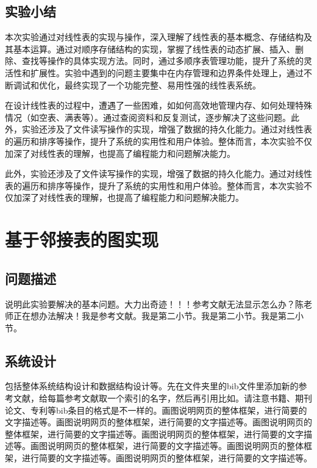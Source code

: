 \documentclass[supercite]{Experimental_Report}
\theoremstyle{definition}
\begin{document}
\subsection{实验小结}

本次实验通过对线性表的实现与操作，深入理解了线性表的基本概念、存储结构及其基本运算。通过对顺序存储结构的实现，掌握了线性表的动态扩展、插入、删除、查找等操作的具体实现方法。同时，通过多顺序表管理功能，提升了系统的灵活性和扩展性。实验中遇到的问题主要集中在内存管理和边界条件处理上，通过不断调试和优化，最终实现了一个功能完整、易用性强的线性表系统。

在设计线性表的过程中，遭遇了一些困难，如如何高效地管理内存、如何处理特殊情况（如空表、满表等）。通过查阅资料和反复测试，逐步解决了这些问题。此外，实验还涉及了文件读写操作的实现，增强了数据的持久化能力。通过对线性表的遍历和排序等操作，提升了系统的实用性和用户体验。整体而言，本次实验不仅加深了对线性表的理解，也提高了编程能力和问题解决能力。

此外，实验还涉及了文件读写操作的实现，增强了数据的持久化能力。通过对线性表的遍历和排序等操作，提升了系统的实用性和用户体验。整体而言，本次实验不仅加深了对线性表的理解，也提高了编程能力和问题解决能力。



\newpage

\section{基于邻接表的图实现}

\subsection{问题描述}

说明此实验要解决的基本问题。大力出奇迹！！！参考文献无法显示怎么办？陈老师正在想办法解决！我是参考文献。我是第二小节\cite{Mehrabian1974An}。我是第二小节\cite{Rezaei2014CVPR}。我是第二小节\cite{Ramnath2008IJCV}。

\subsection{系统设计}

包括整体系统结构设计和数据结构设计等。先在文件夹里的bib文件里添加新的参考文献，给每篇参考文献取一个索引的名字，然后再引用比如\cite{AVS2021Neurocom, Rezaei2014CVPR}。请注意书籍、期刊论文、专利等bib条目的格式是不一样的。画图说明网页的整体框架，进行简要的文字描述等。画图说明网页的整体框架，进行简要的文字描述等。画图说明网页的整体框架，进行简要的文字描述等。画图说明网页的整体框架，进行简要的文字描述等。画图说明网页的整体框架，进行简要的文字描述等。画图说明网页的整体框架，进行简要的文字描述等。画图说明网页的整体框架，进行简要的文字描述等。
\end{document}
